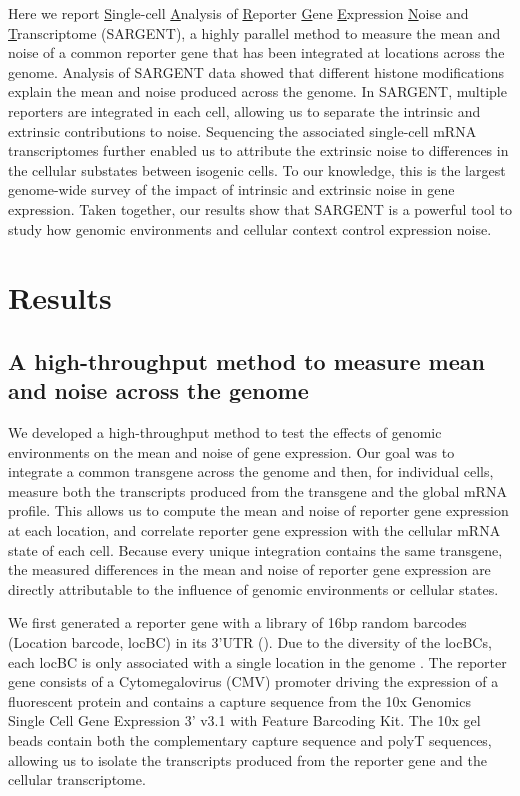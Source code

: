Here we report \underline{S}ingle-cell \underline{A}nalysis of \underline{R}eporter \underline{G}ene \underline{E}xpression \underline{N}oise and \underline{T}ranscriptome (SARGENT), a highly parallel method to measure the mean and noise of a common reporter gene that has been integrated at locations across the genome. Analysis of SARGENT data showed that different histone modifications explain the mean and noise produced across the genome. In SARGENT, multiple reporters are integrated in each cell, allowing us to separate the intrinsic and extrinsic contributions to noise. Sequencing the associated single-cell mRNA transcriptomes further enabled us to attribute the extrinsic noise to differences in the cellular substates between isogenic cells. To our knowledge, this is the largest genome-wide survey of the impact of intrinsic and extrinsic noise in gene expression. Taken together, our results show that SARGENT is a powerful tool to study how genomic environments and cellular context control expression noise.

\section{Results}

\subsection{A high-throughput method to measure mean and noise across the genome}

We developed a high-throughput method to test the effects of genomic environments on the mean and noise of gene expression. Our goal was to integrate a common transgene across the genome and then, for individual cells, measure both the transcripts produced from the transgene and the global mRNA profile. This allows us to compute the mean and noise of reporter gene expression at each location, and correlate reporter gene expression with the cellular mRNA state of each cell. Because every unique integration contains the same transgene, the measured differences in the mean and noise of reporter gene expression are directly attributable to the influence of genomic environments or cellular states.

We first generated a reporter gene with a library of 16bp random barcodes (Location barcode, locBC) in its 3’UTR (). Due to the diversity of the locBCs, each locBC is only associated with a single location in the genome \cite{akhtarw_vansteenselb:ChromatinPosition2013}. The reporter gene consists of a Cytomegalovirus (CMV) promoter driving the expression of a fluorescent protein and contains a capture sequence from the 10x Genomics Single Cell Gene Expression 3' v3.1 with Feature Barcoding Kit. The 10x gel beads contain both the complementary capture sequence and polyT sequences, allowing us to isolate the transcripts produced from the reporter gene and the cellular transcriptome. 

